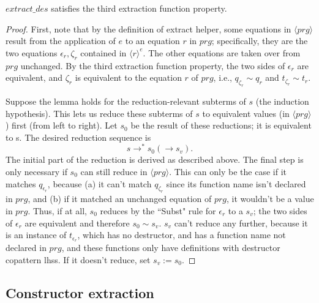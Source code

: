\begin{lemma}

$extract\_des$ satisfies the third extraction function property.

\begin{proof}

First, note that by the definition of extract helper, some equations in $\langle prg \rangle$ result from the application of $e$ to an equation $r$ in $prg$; specifically, they are the two equations $\epsilon_r, \zeta_r$ contained in $\langle r \rangle^e$. The other equations are taken over from $prg$ unchanged. By the third extraction function property, the two sides of $\epsilon_r$ are equivalent, and $\zeta_r$ is equivalent to the equation $r$ of $prg$, i.e., $q_{\zeta_r} \sim q_r$ and $t_{\zeta_r} \sim t_r$.

Suppose the lemma holds for the reduction-relevant subterms of $s$ (the induction hypothesis). This lets us reduce these subterms of $s$ to equivalent values (in $\langle prg \rangle$) first (from left to right). Let $s_0$ be the result of these reductions; it is equivalent to s. The desired reduction sequence is
\begin{equation*}
s \longrightarrow^* s_0 (\longrightarrow s_v).
\end{equation*}
The initial part of the reduction is derived as described above. The final step is only necessary if $s_0$ can still reduce in $\langle prg \rangle$. This can only be the case if it matches $q_{\epsilon_r}$, because (a) it can't match $q_{\zeta_r}$ since its function name isn't declared in $prg$, and (b) if it matched an unchanged equation of $prg$, it wouldn't be a value in $prg$. Thus, if at all, $s_0$ reduces by the ``Subst" rule for $\epsilon_r$ to a $s_v$; the two sides of $\epsilon_r$ are equivalent and therefore $s_0 \sim s_v$. $s_v$ can't reduce any further, because it is an instance of $t_{\epsilon_r}$, which has no destructor, and has a function name not declared in $prg$, and these functions only have definitions with destructor copattern lhss. If it doesn't reduce, set $s_v := s_0$.

\end{proof}

\end{lemma}

\subsection{Constructor extraction}

